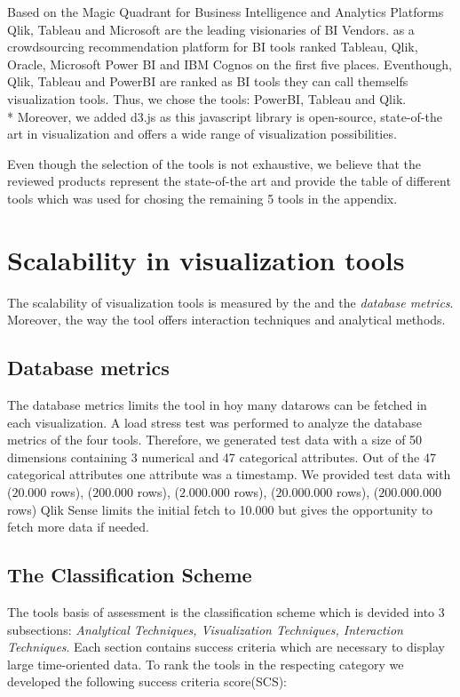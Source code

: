 Based on the Magic Quadrant for Business Intelligence and Analytics Platforms\cite{Parenteau2016} Qlik, Tableau and Microsoft are the leading visionaries of BI Vendors. \cite{ITCentralStation} as a crowdsourcing recommendation platform for BI tools ranked Tableau, Qlik, Oracle, Microsoft Power BI and IBM Cognos on the first five places.
Eventhough, Qlik, Tableau and PowerBI are ranked as BI tools they can call themselfs visualization tools. 
Thus, we chose the tools: PowerBI, Tableau and Qlik.\\*
Moreover, we added d3.js as this javascript library is open-source, state-of-the art in visualization and offers a wide range of visualization possibilities.

Even though the selection of the tools is not exhaustive, we believe that the reviewed products represent the state-of-the art and provide the table of different tools which was used for chosing the remaining 5 tools in the appendix.

\section{Scalability in visualization tools}
The scalability of visualization tools is measured by the  and the \textit{database metrics}. Moreover, the way the tool offers interaction techniques and analytical methods. 

\subsection{Database metrics}
The database metrics limits the tool in hoy many datarows can be fetched in each visualization.
A load stress test was performed to analyze the database metrics of the four tools. Therefore, we generated test data with a size of 50 dimensions containing 3 numerical and 47 categorical attributes. Out of the 47 categorical attributes one attribute was a timestamp. We provided test data with ($20.000$ rows),  ($200.000$ rows), ($2.000.000$ rows), ($20.000.000$ rows), ($200.000.000$ rows)
Qlik Sense limits the initial fetch to 10.000 but gives the opportunity to fetch more data if needed. 





\subsection{The Classification Scheme}
The tools basis of assessment is the classification scheme which is devided into 3  subsections: \textit{Analytical Techniques, Visualization Techniques, Interaction Techniques}. 
Each section contains success criteria which are necessary to display large time-oriented data. To rank the tools in the respecting category we developed the following success criteria score(SCS):

